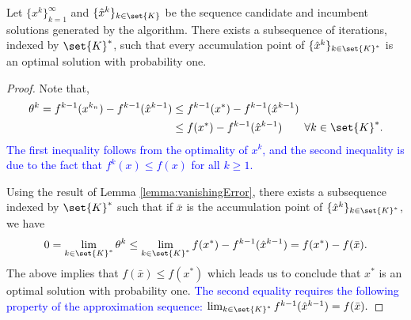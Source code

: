 \documentclass[11pt]{article}
\begin{document}
\begin{theorem}
Let $\{x^k\}_{k=1}^\infty$ and $\{\hat{x}^k\}_{k \in \set{K}}$ be the sequence candidate and incumbent solutions generated by the algorithm. There exists a subsequence of iterations, indexed by $\set{K}^*$, such that every accumulation point of $\{\hat{x}^k\}_{k \in \set{K}^*}$ is an optimal solution with probability one.
\end{theorem}
\begin{proof}
Note that,
\begin{align*}
    \theta^{k} = f^{{k}-1}(x^{k_n}) - f^{{k}-1}(\hat{x}^{{k}-1})
    &\leq f^{{k}-1}(x^*) - f^{{k}-1}(\hat{x}^{{k}-1}) \\
    &\leq f(x^*) - f^{{k}-1}(\hat{x}^{{k}-1})
    \qquad \forall k \in \set{K}^*.
\end{align*}
\textcolor{blue}{The first inequality follows from the optimality of $x^{k}$, and the second inequality is due to the fact that $f^k(x) \leq f(x)$ for all $k \geq 1$.}

Using the result of Lemma \ref{lemma:vanishingError}, there exists a subsequence indexed by $\set{K}^*$ such that if $\bar{x}$ is the accumulation point of $\{\hat{x}^{k}\}_{k \in \set{K}^*}$, we have 
\begin{align*}
    0 = \lim_{k \in \set{K}^*} \theta^{k} \leq \lim_{k \in \set{K}^*} f(x^*) - f^{{k}-1}(\hat{x}^{{k}-1}) = f(x^*) - f(\bar{x}).
\end{align*}
The above implies that $f(\bar{x}) \leq f(x^*)$ which leads us to conclude that $x^*$ is an optimal solution with probability one. \textcolor{blue}{The second equality requires the following property of the approximation sequence: $\lim_{k \in \set{K}^*} f^{k-1}(\hat{x}^{k-1}) = f(\bar{x}).$}
\end{proof}
\end{document}
